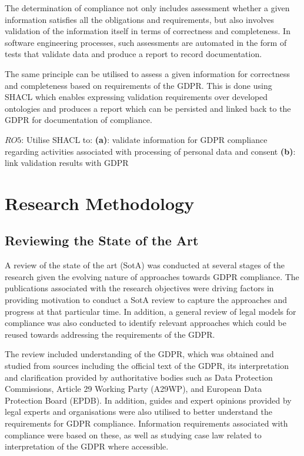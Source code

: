 The determination of compliance not only includes assessment whether a given information satisfies all the obligations and requirements, but also involves validation of the information itself in terms of correctness and completeness.
In software engineering processes, such assessments are automated in the form of tests that validate data and produce a report to record documentation.

The same principle can be utilised to assess a given information for correctness and completeness based on requirements of the GDPR.
This is done using SHACL which enables expressing validation requirements over developed ontologies and produces a report which can be persisted and linked back to the GDPR for documentation of compliance.
\begin{framed}
$RO5$: Utilise SHACL to:
\newline\indent\indent\textbf{(a)}: validate information for GDPR compliance regarding activities associated with processing of personal data and consent
\newline\indent\indent\textbf{(b)}: link validation results with GDPR
\end{framed}

\section{Research Methodology}\label{sec:intro:research-methodology}
\subsection{Reviewing the State of the Art}
A review of the state of the art (SotA) was conducted at several stages of the research given the evolving nature of approaches towards GDPR compliance.
The publications associated with the research objectives were driving factors in providing motivation to conduct a SotA review to capture the approaches and progress at that particular time.
In addition, a general review of legal models for compliance was also conducted to identify relevant approaches which could be reused towards addressing the requirements of the GDPR.

The review included understanding of the GDPR, which was obtained and studied from sources including the official text of the GDPR, its interpretation and clarification provided by authoritative bodies such as Data Protection Commissions, Article 29 Working Party (A29WP), and European Data Protection Board (EPDB).
In addition, guides and expert opinions provided by legal experts and organisations were also utilised to better understand the requirements for GDPR compliance.
Information requirements associated with compliance were based on these, as well as studying case law related to interpretation of the GDPR where accessible.

